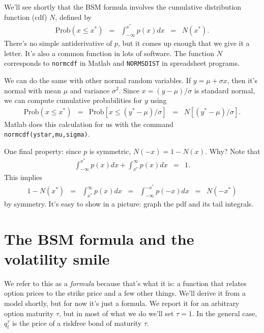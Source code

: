 \documentclass[11pt]{article}
\begin{document}
We'll see shortly that the BSM formula
involves the cumulative distribution function (cdf) $N$,
defined by
\begin{eqnarray*}
    \mbox{Prob} (x \leq x^*)  &=& \int_{-\infty}^{x^*} p(x) dx
        \;\;=\;\; N(x^*).
\end{eqnarray*}
There's no simple antiderivative of $p$, but it comes up enough that
we give it a letter.
It's also a common function in lots of software.
The function $N$ corresponds to {\tt normcdf} in Matlab
and {\tt NORMSDIST} in spreadsheet programs.

We can do the same with other normal random variables.
If $ y = \mu + \sigma x$,
then it's normal with mean $\mu$ and variance $\sigma^2$.
Since $ x = (y-\mu)/\sigma$ is standard normal,
we can compute cumulative probabilities for $y$ using
\begin{eqnarray*}
    \mbox{Prob} (x \leq x^*)  &=& \mbox{Prob} [x \leq (y^*-\mu)/\sigma ]
        \;\;=\;\; N\left[ (y^*-\mu)/\sigma \right].
\end{eqnarray*}
Matlab does this calculation for us with the command {\tt normcdf(ystar,mu,sigma)}.

One final property:  since $p$ is symmetric, $N(-x) = 1 - N(x)$.
Why?
Note that
\begin{eqnarray*}
\int_{-\infty}^{x^*} p(x) dx + \int_{x^*}^{\infty} p(x) dx &=& 1 .
\end{eqnarray*}
This implies
\begin{eqnarray*}
     1 - N(x^*) &=& \int_{x^*}^{\infty} p(x) dx \;\;=\;\; \int_{-\infty}^{-x^*} p(-x) dx
            \;\;=\;\; N(-x^*)
\end{eqnarray*}
by symmetry.
It's easy to show in a picture:
graph the pdf and its tail integrals.


\section{The BSM formula and the volatility smile}


We refer to this as a {\it formula\/} because that's what it is:
a function that relates option prices to the strike price
and a few other things.  We'll derive it from a model shortly,
but for now it's just a formula.
We report it for an arbitrary option maturity $\tau$,
but in most of what we do we'll set $\tau = 1$.
In the general case, $q^\tau_t$ is the price of a riskfree bond
of maturity $\tau$.
\end{document}
